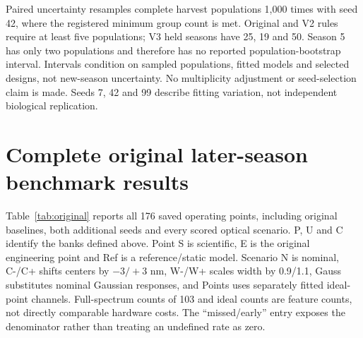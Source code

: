 \documentclass[10pt,a4paper]{article}
\begin{document}
Paired uncertainty resamples complete harvest populations 1,000 times with seed 42, where the registered minimum group count is met. Original and V2 rules require at least five populations; V3 held seasons have 25, 19 and 50. Season 5 has only two populations and therefore has no reported population-bootstrap interval. Intervals condition on sampled populations, fitted models and selected designs, not new-season uncertainty. No multiplicity adjustment or seed-selection claim is made. Seeds 7, 42 and 99 describe fitting variation, not independent biological replication.

\section{Complete original later-season benchmark results}
Table~\ref{tab:original} reports all 176 saved operating points, including original baselines, both additional seeds and every scored optical scenario. P, U and C identify the banks defined above. Point S is scientific, E is the original engineering point and Ref is a reference/static model. Scenario N is nominal, C-/C+ shifts centers by $-3/+3$ nm, W-/W+ scales width by 0.9/1.1, Gauss substitutes nominal Gaussian responses, and Points uses separately fitted ideal-point channels. Full-spectrum counts of 103 and ideal counts are feature counts, not directly comparable hardware costs. The ``missed/early'' entry exposes the denominator rather than treating an undefined rate as zero.
\end{document}
